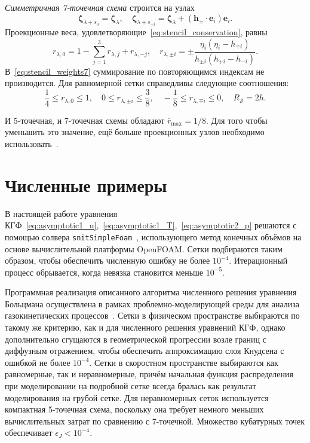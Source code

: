 \documentclass[
aps,%
12pt,%
final,%
notitlepage,%
oneside,%
onecolumn,%
nobibnotes,%
nofootinbib,%
superscriptaddress,%
noshowpacs,%
showkeys,%
centertags]%
{revtex4}
\newcommand{\bzeta}{\boldsymbol{\zeta}}
\newcommand{\bh}{\boldsymbol{h}}
\newcommand{\be}{\boldsymbol{e}}
\begin{document}
\emph{Симметричная 7-точечная схема} строится на узлах
\begin{equation}\label{eq:stencil_nodes7}
    \bzeta_{\lambda+s_0} = \bzeta_{\lambda}, \quad
    \bzeta_{\lambda+s_{\pm i}} = \bzeta_{\lambda} + (\bh_\pm\cdot \be_i)\be_i.
\end{equation}
Проекционные веса, удовлетворяющие~\eqref{eq:stencil_conservation}, равны
\begin{equation}\label{eq:stencil_weights7}
    r_{\lambda,0} = 1 - \sum_{j=1}^3 r_{\lambda,j} + r_{\lambda,-j}, \quad
    r_{\lambda,\pm i} = \pm\frac{\eta_i(\eta_i - h_{\mp i})}{h_{\pm i}(h_{+i}-h_{-i})}.
\end{equation}
В~\eqref{eq:stencil_weights7} суммирование по повторяющимся индексам не производится.
Для равномерной сетки справедливы следующие соотношения:
\begin{equation}\label{eq:weights_ranges7}
    \frac14 \leq r_{\lambda,0} \leq 1, \quad
    0 \leq r_{\lambda,\pm i} \leq \frac38, \quad
    -\frac18 \leq r_{\lambda,\mp i} \leq 0, \quad
    R_\mathcal{S} = 2h.
\end{equation}

И 5-точечная, и 7-точечная схемы обладают \(\bar{r}_{\max}=1/8\).
Для того чтобы уменьшить это значение, ещё больше проекционных узлов необходимо использовать~\citep{Dodulad2012}.

\section{Численные примеры}

В настоящей работе уравнения КГФ~\eqref{eq:asymptotic1_u},~\eqref{eq:asymptotic1_T},~\eqref{eq:asymptotic2_p}
решаются с помощью солвера \verb+snitSimpleFoam+~\cite{Rogozin2014},
использующего метод конечных объёмов на основе вычислительной платформы OpenFOAM\textregistered{}.
Сетки подбираются таким образом, чтобы обеспечить численную ошибку не более \(10^{-4}\).
Итерационный процесс обрывается, когда невязка становится меньше \(10^{-5}\).

Программная реализация описанного алгоритма численного решения уравнения Больцмана
осуществлена в рамках проблемно-моделирующей среды
для анализа газокинетических процессов~\cite{Kloss2011, Kloss2012}.
Сетки в физическом пространстве выбираются по такому же критерию, как и для численного решения уравнений КГФ,
однако дополнительно сгущаются в геометрической прогрессии возле границ с диффузным отражением,
чтобы обеспечить аппроксимацию слоя Кнудсена с ошибкой не более \(10^{-4}\).
Сетки в скоростном пространстве выбираются как равномерные, так и неравномерные,
причём начальная функция распределения при моделировании на подробной сетке всегда бралась
как результат моделирования на грубой сетке.
Для неравномерных сеток используется компактная 5-точечная схема, поскольку она требует
немного меньших вычислительных затрат по сравнению с 7-точечной.
Множество кубатурных точек обеспечивает \(\epsilon_J < 10^{-4}\).
\end{document}
